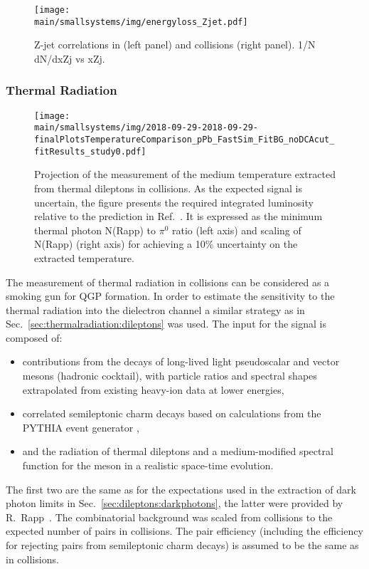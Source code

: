 \documentclass[../report.tex]{subfiles}
\providecommand{\main}{..}
\begin{document}
\begin{figure}[ht]
\centering
\texttt{[image: \\main/smallsystems/img/energyloss\_Zjet.pdf]}

\caption{Z-jet correlations in \pp (left panel) and \pPb collisions (right panel). 1/N dN/dxZj vs xZj.}
\label{fig:smallsystems_energyloss_Zjet}
\end{figure}

\subsubsection{Thermal Radiation}

\begin{figure}[ht]
\centering
\texttt{[image: \\main/smallsystems/img/2018-09-29-2018-09-29-finalPlotsTemperatureComparison\_pPb\_FastSim\_FitBG\_noDCAcut\_fitResults\_study0.pdf]}
\caption{Projection of the measurement of the medium temperature extracted from thermal dileptons in \pPb collisions. As the expected signal is uncertain, the figure presents the required integrated luminosity relative to the prediction in Ref.~\cite{}. It is expressed as the minimum thermal photon N(Rapp) to $\pi^0$ ratio (left axis) and scaling of N(Rapp) (right axis) for achieving a 10\% uncertainty on the extracted temperature.}
\label{fig:smallsystems_thermal_radition}
\end{figure}

The measurement of thermal radiation in \pPb collisions can be considered as a smoking gun for QGP formation. In order to estimate the sensitivity to the thermal radiation into the dielectron channel a similar strategy as in Sec.~\ref{sec:thermalradiation:dileptons} was used. 
The input for the signal is composed of:
\begin{itemize}
\item contributions from the decays of long-lived light pseudoscalar and vector mesons (hadronic cocktail), with particle ratios and spectral shapes extrapolated from existing heavy-ion data at lower energies,
\item correlated semileptonic charm decays based on calculations from the PYTHIA event generator \cite{Sjostrand:2006za}, 
\item and the radiation of thermal dileptons and a medium-modified spectral function for the \Prho meson in a realistic space-time evolution.
\end{itemize}
The first two are the same as for the expectations used in the extraction of dark photon limits in Sec.~\ref{sec:dileptons:darkphotons}, the latter were provided by R.~Rapp~\cite{RappPriv1}. The combinatorial background was scaled from \PbPb collisions to the expected number of pairs in \pPb collisions. The pair efficiency (including the efficiency for rejecting \Pepem pairs from semileptonic charm decays) is assumed to be the same as in \PbPb collisions. 
\end{document}

